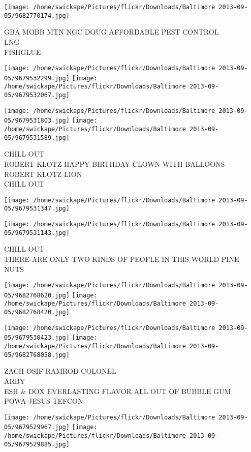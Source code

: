 \documentclass[10pt,letterpaper]{article}
\begin{document}
\vspace{0.25in}
\texttt{[image: /home/swickape/Pictures/flickr/Downloads/Baltimore 2013-09-05/9682770174.jpg]}

GBA MOBB MTN NGC DOUG AFFORDABLE PEST CONTROL\\
LNG\\
FISHGLUE
\pagebreak

\texttt{[image: /home/swickape/Pictures/flickr/Downloads/Baltimore 2013-09-05/9679532299.jpg]}
\texttt{[image: /home/swickape/Pictures/flickr/Downloads/Baltimore 2013-09-05/9679532067.jpg]}

\texttt{[image: /home/swickape/Pictures/flickr/Downloads/Baltimore 2013-09-05/9679531803.jpg]}
\texttt{[image: /home/swickape/Pictures/flickr/Downloads/Baltimore 2013-09-05/9679531589.jpg]}

CHILL OUT\\
ROBERT KLOTZ HAPPY BIRTHDAY CLOWN WITH BALLOONS\\
ROBERT KLOTZ LION\\
CHILL OUT
\pagebreak

\texttt{[image: /home/swickape/Pictures/flickr/Downloads/Baltimore 2013-09-05/9679531347.jpg]}

\vspace{0.25in}
\texttt{[image: /home/swickape/Pictures/flickr/Downloads/Baltimore 2013-09-05/9679531143.jpg]}

CHILL OUT\\
THERE ARE ONLY TWO KINDS OF PEOPLE IN THIS WORLD PINE NUTS
\pagebreak

\texttt{[image: /home/swickape/Pictures/flickr/Downloads/Baltimore 2013-09-05/9682768620.jpg]}
\texttt{[image: /home/swickape/Pictures/flickr/Downloads/Baltimore 2013-09-05/9682768420.jpg]}

\texttt{[image: /home/swickape/Pictures/flickr/Downloads/Baltimore 2013-09-05/9679530423.jpg]}
\texttt{[image: /home/swickape/Pictures/flickr/Downloads/Baltimore 2013-09-05/9682768058.jpg]}

ZACH OSIF RAMROD COLONEL\\
ARBY\\
ESH \& DOX EVERLASTING FLAVOR ALL OUT OF BUBBLE GUM\\
POWA JESUS TEFCON
\pagebreak

\texttt{[image: /home/swickape/Pictures/flickr/Downloads/Baltimore 2013-09-05/9679529967.jpg]}
\texttt{[image: /home/swickape/Pictures/flickr/Downloads/Baltimore 2013-09-05/9679529885.jpg]}
\end{document}

